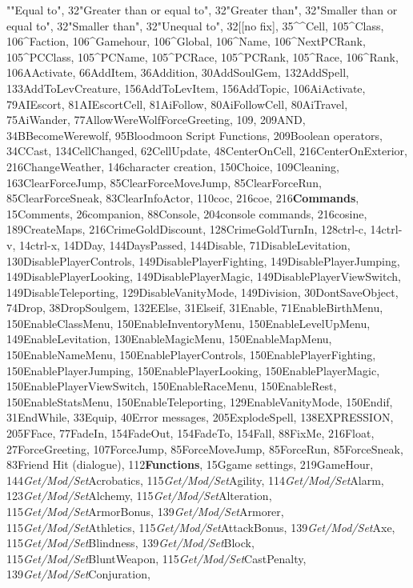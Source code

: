 \documentclass[
]{article}
\begin{document}
""Equal to", 32"Greater than or equal to", 32"Greater than", 32"Smaller
than or equal to", 32"Smaller than", 32"Unequal to", 32{[}{[}no fix{]},
35\^{}\^{}Cell, 105\^{}Class, 106\^{}Faction, 106\^{}Gamehour,
106\^{}Global, 106\^{}Name, 106\^{}NextPCRank, 105\^{}PCClass,
105\^{}PCName, 105\^{}PCRace, 105\^{}PCRank, 105\^{}Race, 106\^{}Rank,
106AActivate, 66AddItem, 36Addition, 30AddSoulGem, 132AddSpell,
133AddToLevCreature, 156AddToLevItem, 156AddTopic, 106AiActivate,
79AIEscort, 81AIEscortCell, 81AiFollow, 80AiFollowCell, 80AiTravel,
75AiWander, 77AllowWereWolfForceGreeting, 109, 209AND,
34BBecomeWerewolf, 95Bloodmoon Script Functions, 209Boolean operators,
34CCast, 134CellChanged, 62CellUpdate, 48CenterOnCell,
216CenterOnExterior, 216ChangeWeather, 146character creation, 150Choice,
109Cleaning, 163ClearForceJump, 85ClearForceMoveJump, 85ClearForceRun,
85ClearForceSneak, 83ClearInfoActor, 110coc, 216coe,
216\textbf{Commands}, 15Comments, 26companion, 88Console, 204console
commands, 216cosine, 189CreateMaps, 216CrimeGoldDiscount,
128CrimeGoldTurnIn, 128ctrl-c, 14ctrl-v, 14ctrl-x, 14DDay,
144DaysPassed, 144Disable, 71DisableLevitation,
130DisablePlayerControls, 149DisablePlayerFighting,
149DisablePlayerJumping, 149DisablePlayerLooking, 149DisablePlayerMagic,
149DisablePlayerViewSwitch, 149DisableTeleporting, 129DisableVanityMode,
149Division, 30DontSaveObject, 74Drop, 38DropSoulgem, 132EElse,
31Elseif, 31Enable, 71EnableBirthMenu, 150EnableClassMenu,
150EnableInventoryMenu, 150EnableLevelUpMenu, 149EnableLevitation,
130EnableMagicMenu, 150EnableMapMenu, 150EnableNameMenu,
150EnablePlayerControls, 150EnablePlayerFighting,
150EnablePlayerJumping, 150EnablePlayerLooking, 150EnablePlayerMagic,
150EnablePlayerViewSwitch, 150EnableRaceMenu, 150EnableRest,
150EnableStatsMenu, 150EnableTeleporting, 129EnableVanityMode, 150Endif,
31EndWhile, 33Equip, 40Error messages, 205ExplodeSpell, 138EXPRESSION,
205FFace, 77FadeIn, 154FadeOut, 154FadeTo, 154Fall, 88FixMe, 216Float,
27ForceGreeting, 107ForceJump, 85ForceMoveJump, 85ForceRun,
85ForceSneak, 83Friend Hit (dialogue), 112\textbf{Functions}, 15Ggame
settings, 219GameHour, 144\emph{Get/Mod/Set}Acrobatics,
115\emph{Get/Mod/Set}Agility, 114\emph{Get/Mod/Set}Alarm,
123\emph{Get/Mod/Set}Alchemy, 115\emph{Get/Mod/Set}Alteration,
115\emph{Get/Mod/Set}ArmorBonus, 139\emph{Get/Mod/Set}Armorer,
115\emph{Get/Mod/Set}Athletics, 115\emph{Get/Mod/Set}AttackBonus,
139\emph{Get/Mod/Set}Axe, 115\emph{Get/Mod/Set}Blindness,
139\emph{Get/Mod/Set}Block, 115\emph{Get/Mod/Set}BluntWeapon,
115\emph{Get/Mod/Set}CastPenalty, 139\emph{Get/Mod/Set}Conjuration,
\end{document}
